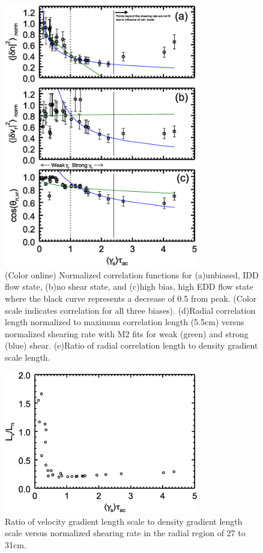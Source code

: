 \documentclass[aip,pop,amsmath,amssymb,peprint,superscriptaddress]{revtex4-1} %
\begin{document}
\begin{figure}[!htbp]
\centerline{
\includegraphics[width=8.5cm]{figure4.eps}}
\caption{\label{fig:radcorr} (Color online) Normalized correlation functions for (a)unbiased, IDD flow state, (b)no shear state, and (c)high bias, high EDD flow state where the black curve represents a decrease of 0.5 from peak. (Color scale indicates correlation for all three biases). (d)Radial correlation length normalized to maximum correlation length (5.5cm) versus normalized shearing rate with M2 fits for weak (green) and strong (blue) shear. (e)Ratio of radial correlation length to density gradient scale length.}
\end{figure}

\begin{figure}[!htbp]
\centerline{
\includegraphics[width=8.5cm]{figure5.eps}}
\caption{\label{fig:LgammaLn} Ratio of velocity gradient length scale
  to density gradient length scale versus normalized shearing rate in the radial region of 27 to 31cm.}
\end{figure}
\end{document}

